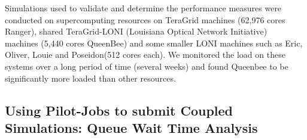 \documentclass[conference,final]{IEEEtran}
\newcommand{\jhanote}[1]{ {\textcolor{red} { ***Jha: #1 }}}
\newcommand{\jhanote}[1]{}
\begin{document}
Simulations used to validate and determine the performance measures
were conducted on supercomputing resources on TeraGrid machines
(62,976 cores Ranger), shared TeraGrid-LONI (Louisiana Optical Network
Initiative)~\cite{LONI_web} machines (5,440 cores QueenBee) and some
smaller LONI machines such as Eric, Oliver, Louie and Poseidon(512
cores each).  We monitored the load on these systems over a long
period of time (several weeks) and found Queenbee to be significantly
more loaded than other resources.



\subsection{Using Pilot-Jobs to submit Coupled Simulations: Queue Wait
  Time Analysis}
\end{document}
